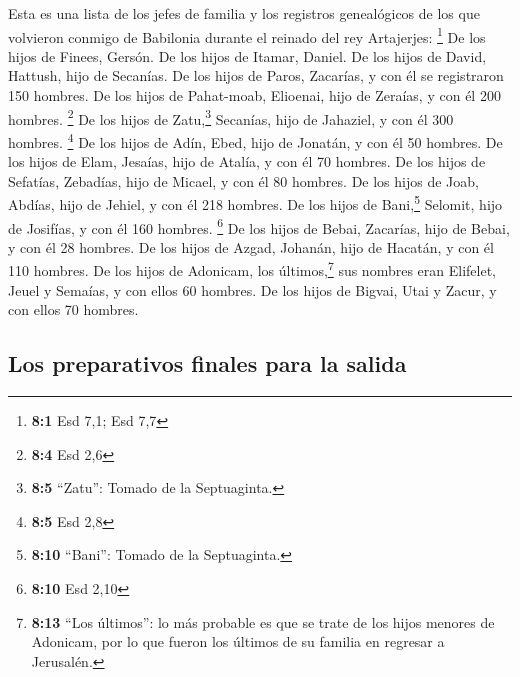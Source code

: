  Esta es una lista de los jefes de familia y los registros
genealógicos de los que volvieron conmigo de Babilonia durante el
reinado del rey Artajerjes: \footnote{\textbf{8:1} Esd 7,1; Esd 7,7}
 De los hijos de Finees, Gersón. De los hijos de Itamar,
Daniel. De los hijos de David, Hattush,  hijo de Secanías.
De los hijos de Paros, Zacarías, y con él se registraron 150 hombres.
 De los hijos de Pahat-moab, Elioenai, hijo de Zeraías, y
con él 200 hombres. \footnote{\textbf{8:4} Esd 2,6}  De
los hijos de Zatu,\footnote{\textbf{8:5} ``Zatu'': Tomado de la
  Septuaginta.} Secanías, hijo de Jahaziel, y con él 300 hombres.
\footnote{\textbf{8:5} Esd 2,8}  De los hijos de Adín,
Ebed, hijo de Jonatán, y con él 50 hombres.  De los hijos
de Elam, Jesaías, hijo de Atalía, y con él 70 hombres.  De
los hijos de Sefatías, Zebadías, hijo de Micael, y con él 80 hombres.
 De los hijos de Joab, Abdías, hijo de Jehiel, y con él
218 hombres.  De los hijos de Bani,\footnote{\textbf{8:10}
  ``Bani'': Tomado de la Septuaginta.} Selomit, hijo de Josifías, y con
él 160 hombres. \footnote{\textbf{8:10} Esd 2,10}  De los
hijos de Bebai, Zacarías, hijo de Bebai, y con él 28 hombres.
 De los hijos de Azgad, Johanán, hijo de Hacatán, y con
él 110 hombres.  De los hijos de Adonicam, los
últimos,\footnote{\textbf{8:13} ``Los últimos'': lo más probable es que
  se trate de los hijos menores de Adonicam, por lo que fueron los
  últimos de su familia en regresar a Jerusalén.} sus nombres eran
Elifelet, Jeuel y Semaías, y con ellos 60 hombres.  De
los hijos de Bigvai, Utai y Zacur, y con ellos 70 hombres.

\hypertarget{los-preparativos-finales-para-la-salida}{%
\subsection{Los preparativos finales para la
salida}\label{los-preparativos-finales-para-la-salida}}

